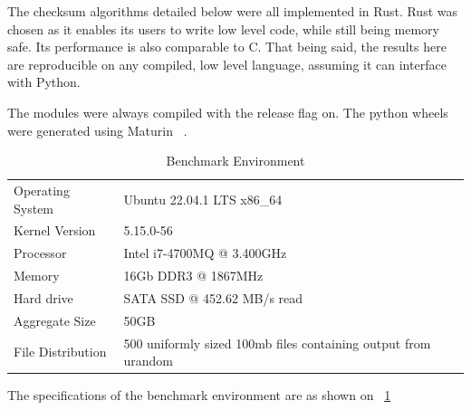 The checksum algorithms detailed below were all implemented in Rust.
Rust was chosen as it enables its users to write low level code, while still being memory safe.
Its performance is also comparable to C. That being said, the results here are reproducible on any compiled, low level
language, assuming it can interface with Python.

The modules were always compiled with the release flag on.
The python wheels were generated using Maturin ~\cite{Maturin}.

\begin{table}[]
\begin{tabular}{ll}
Operating System  & Ubuntu 22.04.1 LTS x86\_64                                     \\
Kernel Version    & 5.15.0-56                                                      \\
Processor         & Intel i7-4700MQ @ 3.400GHz                                     \\
Memory            & 16Gb DDR3 @ 1867MHz                                             \\
Hard drive        & SATA SSD @ 452.62 MB/s read                                    \\
Aggregate Size    & 50GB                                                           \\
File Distribution & 500 uniformly sized 100mb files containing output from urandom
\end{tabular}
\caption{Benchmark Environment}
\label{tab:checksum_tab_1}
\end{table}

The specifications of the benchmark environment are as shown on ~\ref{tab:checksum_tab_1}


\begin{bchart}[step=2,max=400]
        \smallskip
        \medskip
        \bigskip
\end{bchart}